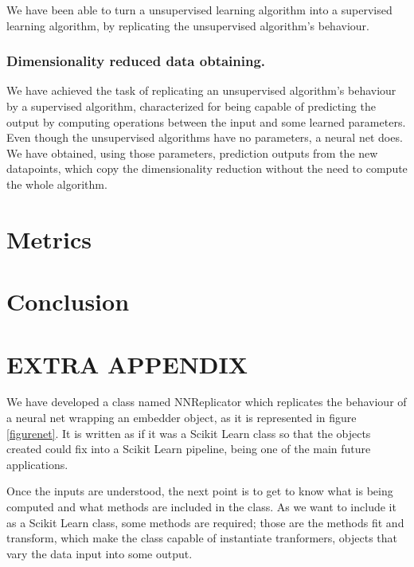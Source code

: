 \documentclass[a4paper,11pt,spanish]{report}
\begin{document}
We have been able to turn a unsupervised learning algorithm into a supervised learning algorithm, by replicating the unsupervised algorithm's behaviour.

\subsection{Dimensionality reduced data obtaining.}
\label{ssec:trans}

We have achieved the task of replicating an unsupervised algorithm's behaviour by a supervised algorithm, characterized for being capable of predicting the output by computing operations between the input and some learned parameters.
Even though the unsupervised algorithms have no parameters, a neural net does. We have obtained, using those parameters, prediction outputs from the new datapoints, which copy the dimensionality reduction without the need to compute the whole algorithm.


\chapter{Metrics}
\label{chap:met}



\chapter{Conclusion}
\label{chap:conc}



\chapter{EXTRA APPENDIX}
\label{chap:append}

We have developed a class named NNReplicator which replicates the behaviour of a neural net wrapping an embedder object, as it is represented in figure \ref{figurenet}. It is written as if it was a Scikit Learn class so that the objects created could fix into a Scikit Learn pipeline, being one of the main future applications.

Once the inputs are understood, the next point is to get to know what is being computed and what methods are included in the class. As we want to include it as a Scikit Learn class, some methods are required; those are the methods fit and transform, which make the class capable of instantiate tranformers, objects that vary the data input into some output.
\end{document}
